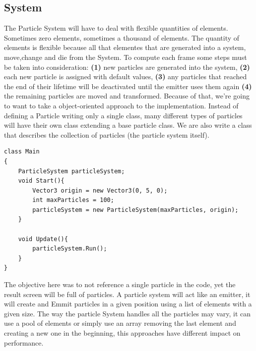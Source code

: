 \subsection{System}
The Particle System will have to deal with flexible quantities of elements. Sometimes zero elements, sometimes a thousand of elements. The quantity of elements is flexible because all that elementes that are generated into a system, move,change and die from the System. To compute each frame some steps must be taken into consideration: \textbf{(1)} new particles are generated into the system, \textbf{(2)} each new particle is assigned with default values, \textbf{(3)} any particles that reached the end of their lifetime will be deactivated until the emitter uses them again \textbf{(4)} the remaining particles are moved and transformed. Because of that, we're going to want to take a object-oriented approach to the implementation. Instead of defining a Particle writing only a single class, many different types of particles will have their own class extending a base particle class. We are also write a class that describes the collection of particles (the particle system itself).

\begin{lstlisting}
class Main
{
	ParticleSystem particleSystem;
	void Start(){
		Vector3 origin = new Vector3(0, 5, 0);
		int maxParticles = 100;
		particleSystem = new ParticleSystem(maxParticles, origin);
	}

	void Update(){
		particleSystem.Run();
	}
}
\end{lstlisting}
The objective here was to not reference a single particle in the code, yet the result screen will be full of particles. A particle system will act like an emitter, it will create and Emmit particles in a given position using a list of elements with a given size. The way the particle System handles all the particles may vary, it can use a pool of elements or simply use an array removing the last element and creating a new one in the beginning, this approaches have different impact on performance.

